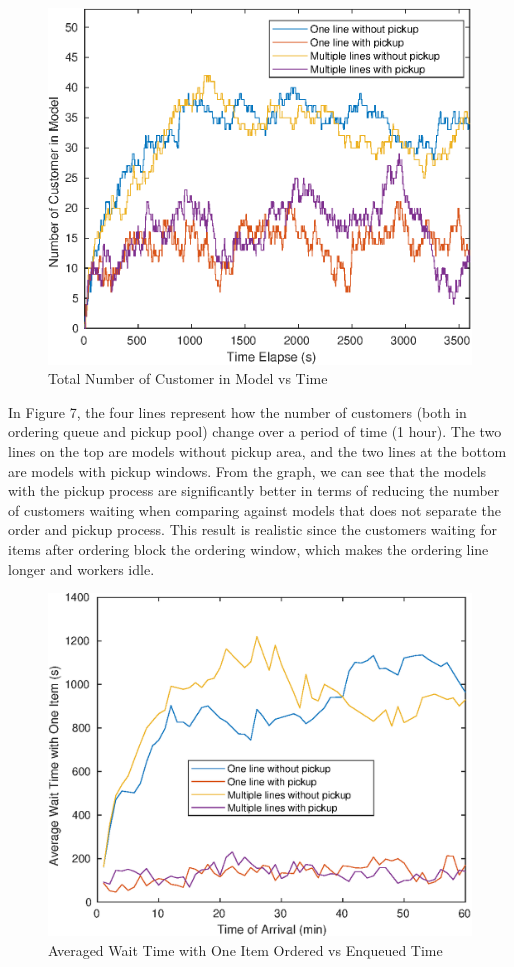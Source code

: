 \documentclass[a4paper]{article}
\begin{document}
\begin{figure}[H]
	\centering
	\includegraphics[width=0.35\textheight]{population_vs_time}
	\caption{Total Number of Customer in Model vs Time}
\end{figure}

In Figure 7, the four lines represent how the number of customers (both in ordering queue and pickup pool) change over a period of time (1 hour). The two lines on the top are models without pickup area, and the two lines at the bottom are models with pickup windows. From the graph, we can see that the models with the pickup process are significantly better in terms of reducing the number of customers waiting when comparing against models that does not separate the order and pickup process. This result is realistic since the customers waiting for items after ordering block the ordering window, which makes the ordering line longer and workers idle. 

\begin{figure}[H]
	\centering
	\includegraphics[width=0.35\textheight]{wait_time_one_item}
	\caption{Averaged Wait Time with One Item Ordered vs Enqueued Time}
\end{figure}
\end{document}
